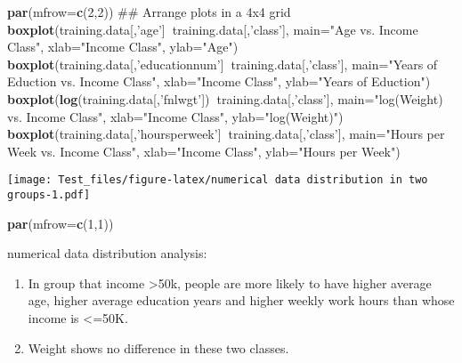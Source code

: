 \documentclass[]{article}
\newenvironment{Shaded}{\begin{snugshade}}{\end{snugshade}}
\newcommand{\KeywordTok}[1]{\textcolor[rgb]{0.13,0.29,0.53}{\textbf{#1}}}
\newcommand{\DataTypeTok}[1]{\textcolor[rgb]{0.13,0.29,0.53}{#1}}
\newcommand{\DecValTok}[1]{\textcolor[rgb]{0.00,0.00,0.81}{#1}}
\newcommand{\StringTok}[1]{\textcolor[rgb]{0.31,0.60,0.02}{#1}}
\newcommand{\OperatorTok}[1]{\textcolor[rgb]{0.81,0.36,0.00}{\textbf{#1}}}
\newcommand{\NormalTok}[1]{#1}
\begin{document}
\begin{Shaded}
\begin{Highlighting}[]
\KeywordTok{par}\NormalTok{(}\DataTypeTok{mfrow=}\KeywordTok{c}\NormalTok{(}\DecValTok{2}\NormalTok{,}\DecValTok{2}\NormalTok{))  ## Arrange plots in a 4x4 grid}
\KeywordTok{boxplot}\NormalTok{(training.data[,}\StringTok{'age'}\NormalTok{]}\OperatorTok{~}\NormalTok{training.data[,}\StringTok{'class'}\NormalTok{], }\DataTypeTok{main=}\StringTok{"Age vs. Income Class"}\NormalTok{, }
        \DataTypeTok{xlab=}\StringTok{"Income Class"}\NormalTok{, }\DataTypeTok{ylab=}\StringTok{"Age"}\NormalTok{)}
\KeywordTok{boxplot}\NormalTok{(training.data[,}\StringTok{'educationnum'}\NormalTok{]}\OperatorTok{~}\NormalTok{training.data[,}\StringTok{'class'}\NormalTok{], }\DataTypeTok{main=}\StringTok{"Years of Eduction vs. Income Class"}\NormalTok{, }
        \DataTypeTok{xlab=}\StringTok{"Income Class"}\NormalTok{, }\DataTypeTok{ylab=}\StringTok{"Years of Eduction"}\NormalTok{)}
\KeywordTok{boxplot}\NormalTok{(}\KeywordTok{log}\NormalTok{(training.data[,}\StringTok{'fnlwgt'}\NormalTok{])}\OperatorTok{~}\NormalTok{training.data[,}\StringTok{'class'}\NormalTok{], }\DataTypeTok{main=}\StringTok{"log(Weight) vs. Income Class"}\NormalTok{, }
        \DataTypeTok{xlab=}\StringTok{"Income Class"}\NormalTok{, }\DataTypeTok{ylab=}\StringTok{"log(Weight)"}\NormalTok{)}
\KeywordTok{boxplot}\NormalTok{(training.data[,}\StringTok{'hoursperweek'}\NormalTok{]}\OperatorTok{~}\NormalTok{training.data[,}\StringTok{'class'}\NormalTok{], }\DataTypeTok{main=}\StringTok{"Hours per Week vs. Income Class"}\NormalTok{, }
        \DataTypeTok{xlab=}\StringTok{"Income Class"}\NormalTok{, }\DataTypeTok{ylab=}\StringTok{"Hours per Week"}\NormalTok{)}
\end{Highlighting}
\end{Shaded}

\texttt{[image: Test\_files/figure-latex/numerical data distribution in two groups-1.pdf]}

\begin{Shaded}
\begin{Highlighting}[]
\KeywordTok{par}\NormalTok{(}\DataTypeTok{mfrow=}\KeywordTok{c}\NormalTok{(}\DecValTok{1}\NormalTok{,}\DecValTok{1}\NormalTok{))}
\end{Highlighting}
\end{Shaded}

numerical data distribution analysis:

\begin{enumerate}
\def\labelenumi{\arabic{enumi}.}
\item
  In group that income \textgreater{}50k, people are more likely to have
  higher average age, higher average education years and higher weekly
  work hours than whose income is \textless{}=50K.
\item
  Weight shows no difference in these two classes.
\end{enumerate}
\end{document}
